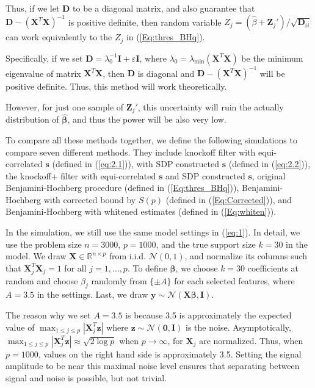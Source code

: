 \documentclass{uwstat572}
\begin{document}
Thus, if we let $\bm{D}$ to be a diagonal matrix, and also guarantee that $\bm{D} - (\bm{X}^T\bm{X})^{-1}$ is positive definite, then random variable $Z_j = (\hat{\beta} + \bm{Z}_j')/\sqrt{\bm{D}_{ii}}$ can work equivalently to the $Z_j$ in (\ref{Eq:thres_BHq}).

Specifically, if we set $\bm{D} = \lambda_0^{-1} \bm{I} + \varepsilon\bm{I}$, where $\lambda_0 = \lambda_{\min} (\bm{X}^T\bm{X})$ be the minimum eigenvalue of matrix $\bm{X}^T\bm{X}$, then $\bm{D}$ is diagonal and $\bm{D} - (\bm{X}^T\bm{X})^{-1}$ will be positive definite. Thus, this method will work theoretically.

However, for just one sample of $\bm{Z}_j'$, this uncertainty will ruin the actually distribution of $\hat{\bm{\beta}}$, and thus the power will be also very low.

To compare all these methods together, we define the following simulations to compare seven different methods. They include knockoff filter with equi-correlated $\bm{s}$ (defined in (\ref{eq:2.1})), with SDP constructed $\bm{s}$ (defined in (\ref{eq:2.2})), the knockoff$+$ filter with equi-correlated $\bm{s}$ and SDP constructed $\bm{s}$, original Benjamini-Hochberg procedure (defined in (\ref{Eq:thres_BHq})), Benjamini-Hochberg with corrected bound by $S(p)$ (defined in (\ref{Eq:Corrected})), and Benjamini-Hochberg with whitened estimates (defined in (\ref{Eq:whiten})). 

In the simulation, we still use the same model settings in (\ref{eq:1}). In detail, we use the problem size $n=3000$, $p=1000$, and the true support size $k=30$ in the model. We draw $\bm{X}\in\mathbb{R}^{n\times p}$ from i.i.d. $\mathcal{N}(0,1)$, and normalize its columns such that $\bm{X}_j^T\bm{X}_j=1$ for all $j=1,\dots, p$. To define $\bm{\beta}$, we choose $k=30$ coefficients at random and choose $\beta_j$ randomly from $\{\pm A\}$ for each selected features, where $A=3.5$ in the settings. Last, we draw $\bm{y} \sim \mathcal{N}(\bm{X\beta}, \bm{I})$.

The reason why we set $A=3.5$ is because 3.5 is approximately the expected value of $\max_{1\leq j\leq p}|\bm{X}_j^T\bm{z}|$ where $\bm{z} \sim \mathcal{N}(\bm{0}, \bm{I})$ is the noise. Asymptotically, $\max_{1\leq j\leq p}|\bm{X}_j^T\bm{z}| \approx \sqrt{2\log{p}}$ when $p\rightarrow \infty$, for $\bm{X}_j$ are normalized. Thus, when $p=1000$, values on the right hand side is approximately 3.5. Setting the signal amplitude to be near this maximal noise level ensures that separating between signal and noise is possible, but not trivial.
\end{document}
